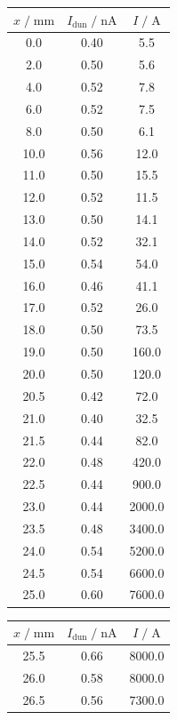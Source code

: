 \begin{table}
    \centering
    \begin{tabular}[t]{ccc|}
    \toprule
    $x\;/\; \si{\milli\meter}$ & $I_\text{dun}\;/\;\si{\nano\A}$ & $I \;/\; \si{\A}$\\
    \midrule
    0.0 & 0.40 & 5.5        \\
    2.0 & 0.50 & 5.6        \\
    4.0 & 0.52 & 7.8        \\
    6.0 & 0.52 & 7.5        \\
    8.0 & 0.50 & 6.1        \\
    10.0 & 0.56 & 12.0      \\
    11.0 & 0.50 & 15.5      \\
    12.0 & 0.52 & 11.5      \\
    13.0 & 0.50 & 14.1      \\
    14.0 & 0.52 & 32.1      \\
    15.0 & 0.54 & 54.0      \\
    16.0 & 0.46 & 41.1      \\
    17.0 & 0.52 & 26.0      \\
    18.0 & 0.50 & 73.5      \\
    19.0 & 0.50 & 160.0     \\
    20.0 & 0.50 & 120.0     \\
    20.5 & 0.42 & 72.0      \\
    21.0 & 0.40 & 32.5      \\
    21.5 & 0.44 & 82.0      \\
    22.0 & 0.48 & 420.0     \\
    22.5 & 0.44 & 900.0     \\
    23.0 & 0.44 & 2000.0    \\
    23.5 & 0.48 & 3400.0    \\
    24.0 & 0.54 & 5200.0    \\
    24.5 & 0.54 & 6600.0    \\
    25.0 & 0.60 & 7600.0    \\
    \bottomrule
    \end{tabular}
    \begin{tabular}[t]{|ccc}
    \toprule
    $x\;/\; \si{\milli\meter}$ & $I_\text{dun}\;/\;\si{\nano\A}$ & $I \;/\; \si{\A}$\\
    \midrule
    25.5 & 0.66 & 8000.0    \\
    26.0 & 0.58 & 8000.0    \\
    26.5 & 0.56 & 7300.0    \\

\end{tabular}
\end{table}
